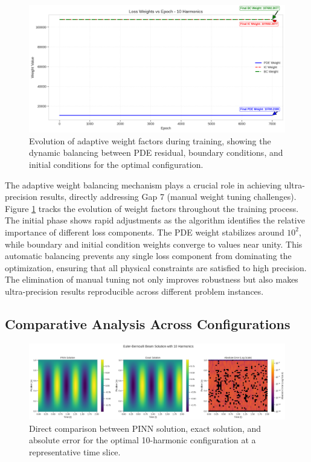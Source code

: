 \begin{figure}[ht]
    \centering
    \includegraphics[width = 1.0\linewidth]{figures/weight_factors_10h.png}
    \caption{Evolution of adaptive weight factors during training, showing the dynamic balancing between PDE residual, boundary conditions, and initial conditions for the optimal configuration.}
    \label{fig:weight_factors}
\end{figure}

The adaptive weight balancing mechanism plays a crucial role in achieving ultra-precision results, directly addressing Gap 7 (manual weight tuning challenges). Figure \ref{fig:weight_factors} tracks the evolution of weight factors throughout the training process. The initial phase shows rapid adjustments as the algorithm identifies the relative importance of different loss components. The PDE weight stabilizes around $10^2$, while boundary and initial condition weights converge to values near unity. This automatic balancing prevents any single loss component from dominating the optimization, ensuring that all physical constraints are satisfied to high precision. The elimination of manual tuning not only improves robustness but also makes ultra-precision results reproducible across different problem instances.

\subsection{Comparative Analysis Across Configurations}

\begin{figure}[ht]
    \centering
    \includegraphics[width = 1.0\linewidth]{figures/comparison_10h.png}
    \caption{Direct comparison between PINN solution, exact solution, and absolute error for the optimal 10-harmonic configuration at a representative time slice.}
    \label{fig:comparison_10h}
\end{figure}

